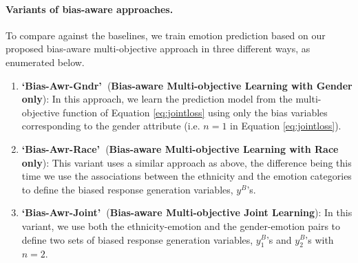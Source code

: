 \documentclass[letterpaper]{article}
\newcommand{\MTLG}{`Bias-Awr-Gndr'~}
\newcommand{\MTLR}{`Bias-Awr-Race'~}
\newcommand{\MTLB}{`Bias-Awr-Joint'~}
\begin{document}
\paragraph{Variants of bias-aware approaches.}
To compare against the baselines, we train emotion prediction based on our proposed bias-aware multi-objective approach in three different ways, as enumerated below.
\begin{enumerate}
\item \textbf{\MTLG}(\textbf{Bias-aware Multi-objective Learning with Gender only}): In this approach, we learn the prediction model from the multi-objective function of Equation \ref{eq:jointloss} using only the bias variables corresponding to the gender attribute (i.e. $n=1$ in Equation \ref{eq:jointloss}).

\item \textbf{\MTLR}(\textbf{Bias-aware Multi-objective Learning with Race only}): This variant uses a similar approach as above, the difference being this time we use the associations between the ethnicity and the emotion categories to define the biased response generation variables, $y^B$'s.

\item \textbf{\MTLB}(\textbf{Bias-aware Multi-objective Joint Learning}): In this variant, we use both the ethnicity-emotion and the gender-emotion pairs to define two sets of biased response generation variables,
$y^B_1$'s and $y^B_2$'s with $n=2$.
\end{enumerate}
\end{document}
